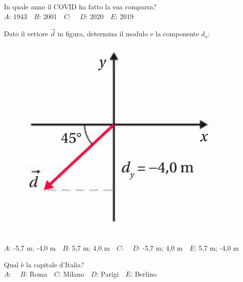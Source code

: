 \def\mcquestionnumber{11}


\mcquestionheader In quale anno il COVID ha fatto la sua comparsa?\\
{$A$}: 1943\ \ {$B$}: 2001\ \ {$C$}: \ \ {$D$}: 2020\ \ {$E$}: 2019\ \ 

\mcquestionfooter



\def\mcquestionnumber{12}


\mcquestionheader Dato il vettore $\vec{d}$ in figura, determina il modulo e la componente $d_x$: \begin{figure}[h!]   \begin{center}     \includegraphics[scale=0.35]{vettored.png}   \end{center} \end{figure}\\
{$A$}: -5,7 m; -4,0 m\ \ {$B$}: 5,7 m; 4,0 m\ \ {$C$}: \ \ {$D$}: -5,7 m; 4,0 m\ \ {$E$}: 5,7 m; -4,0 m\ \ 

\mcquestionfooter



\mcpaperfooter

\def\mcserialnumber{19}
\mcpaperheader


\def\mcquestionnumber{1}


\mcquestionheader Qual è la capitale d’Italia?\\
{$A$}: \ \ {$B$}: Roma\ \ {$C$}: Milano\ \ {$D$}: Parigi\ \ {$E$}: Berlino\ \ 

\mcquestionfooter



\def\mcquestionnumber{2}


